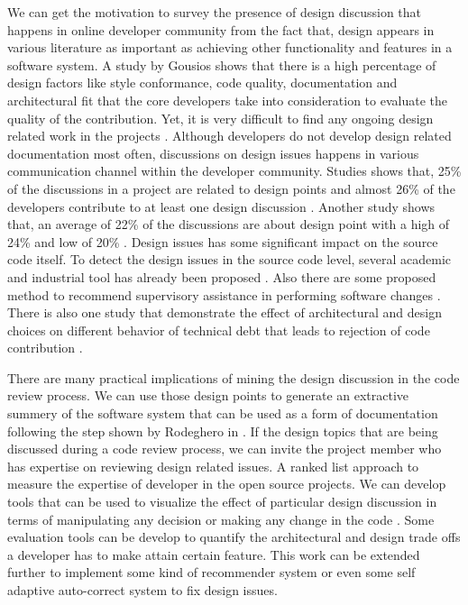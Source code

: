 We can get the motivation to survey the presence of design discussion that happens in online developer community from the fact that, design appears in various literature as important as achieving other functionality and features in a software system. A study by Gousios \cite{Gousios2015} shows that there is a high percentage of design factors like style conformance, code quality, documentation and architectural fit that the core developers take into consideration to evaluate the quality of the contribution. Yet, it is very difficult to find any ongoing design related work in the projects \cite{Brunet2014a}. Although developers do not develop design related documentation most often, discussions on design issues happens in various communication channel within the developer community. Studies shows that, 25\% of the discussions in a project are related to design points and almost 26\% of the developers contribute to at least one design discussion \cite{Brunet2014a}. Another study shows that, an average of 22\% of the discussions are about design point with a high of 24\% and low of 20\% \cite{Viviani2018}. Design issues has some significant impact on the source code itself. To detect the design issues in the source code level, several academic and industrial tool has already been proposed \cite{Sousa2018}. Also there are some proposed method to recommend supervisory assistance in performing software changes \cite{Kagdi2008}. There is also one study that demonstrate the effect of architectural and design choices on different behavior of technical debt that leads to rejection of code contribution \cite{Curtis2012a}.

There are many practical implications of mining the design discussion in the code review process. We can use those design points to generate an extractive summery of the software system that can be used as a form of documentation following the step shown by Rodeghero in \cite{Rod2017}. If the design topics that are being discussed during a code review process, we can invite the project member who has expertise on reviewing design related issues. A ranked list approach \cite{Kagdi2008} to measure the expertise of developer in the open source projects. We can develop tools that can be used to visualize the effect of particular design discussion in terms of manipulating any decision or making any change in the code \cite{Viviani2018a}. Some evaluation tools can be develop to quantify the architectural and design trade offs a developer has to make attain certain feature. This work can be extended further to implement some kind of recommender system or even some self adaptive auto-correct system to fix design issues.

